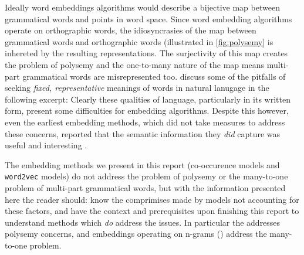Ideally word embeddings algorithms would describe a bijective map between grammatical words and points in word space. Since word embedding algorithms operate on orthographic words, the idiosyncrasies of the map between grammatical words and orthographic words (illustrated in \autoref{fig:polysemy} is inhereted by the resulting representations. The surjectivity of this map creates the problem of polysemy and the one-to-many nature of the map means multi-part grammatical words are misrepresented too.
\citeauthor{halliday-2004-lexicology} discuss some of the pitfalls of seeking \emph{fixed, representative} meanings of words in natural lanugage in the following excerpt:
Clearly these qualities of language, particularly in its written form, present some difficulties for embedding algorithms. Despite this however, even the earliest embedding methods, which did not take measures to address these concerns, reported that the semantic information they \emph{did} capture was useful and interesting \parencite{deerwester-1990-indexing-by-lsa}.

The embedding methods we present in this report (co-occurence models and \texttt{word2vec} models) do not address the problem of polysemy or the many-to-one problem of multi-part grammatical words, but with the information presented here the reader should: {\small{}} know the comprimises made by models not accounting for these factors, and {\small{}} have the context and prerequisites upon finishing this report to understand methods which \emph{do} address the issues. In particular the  addresses polysemy concerns, and embeddings operating on n-grams () address the many-to-one problem.
